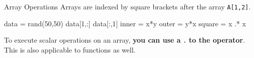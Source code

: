 \documentclass{beamer}
\newenvironment{Boxx}{\begin{tcolorbox}[standard jigsaw, opacityframe=0.8, opacityback=0.0,left=2pt,right=2pt,top=0pt,bottom=0pt]}{\end{tcolorbox}}
\begin{document}
\begin{frame}[fragile]{Array Operations}
	Arrays are indexed by square brackets after the array {\color{red}\verb|A[1,2]|}. 
	
\pause	
  \begin{Boxx}
  \begin{jllisting}
		data = rand(50,50)
		data[1,:]
		data[:,1]
		inner = x*y
		outer = y*x
		square = x .* x
	\end{jllisting}
  \end{Boxx}

	
	To execute scalar operations on an array, \textbf{you can use a} \verb|.| \textbf{to the operator}. This is also applicable to functions as well.
		
	\pause
	\vspace*{0.5cm}
	\pause
	
	\vspace*{0.5cm}
	
	
\end{frame}
\end{document}
